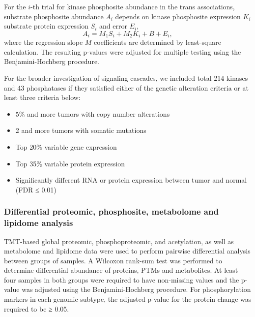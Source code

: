 For the $i$-th trial for kinase phosphosite abundance in the trans associations, substrate phosphosite abundance $A_i$ depends on kinase phosphosite expression $K_i$ substrate protein expression $S_i$ and error $E_i$,
\[
    A_i = M_1 S_i + M_2 K_i + B + E_i,
\]
where the regression slope $M$ coefficients are determined by least-square calculation. The resulting p-values were adjusted for multiple testing using the Benjamini-Hochberg procedure.

For the broader investigation of signaling cascades, we included total 214 kinases and 43 phosphatases if they satisfied either of the genetic alteration criteria or at least three criteria below:
\begin{itemize}
    \tightlist
    \item 5\% and more tumors with copy number alterations
    \item 2 and more tumors with somatic mutations
    \item Top 20\% variable gene expression
    \item Top 35\% variable protein expression
    \item Significantly different RNA or protein expression between tumor and normal (FDR ≤ 0.01)
\end{itemize}

\subsubsection{Differential proteomic, phosphosite, metabolome and lipidome analysis}
TMT-based global proteomic, phosphoproteomic, and acetylation, as well as metabolome and lipidome data were used to perform pairwise differential analysis between groups of samples. A Wilcoxon rank-sum test was performed to determine differential abundance of proteins, PTMs and metabolites. At least four samples in both groups were required to have non-missing values and the p-value was adjusted using the Benjamini-Hochberg procedure. For phosphorylation markers in each genomic subtype, the adjusted p-value for the protein change was required to be ≥ 0.05.

